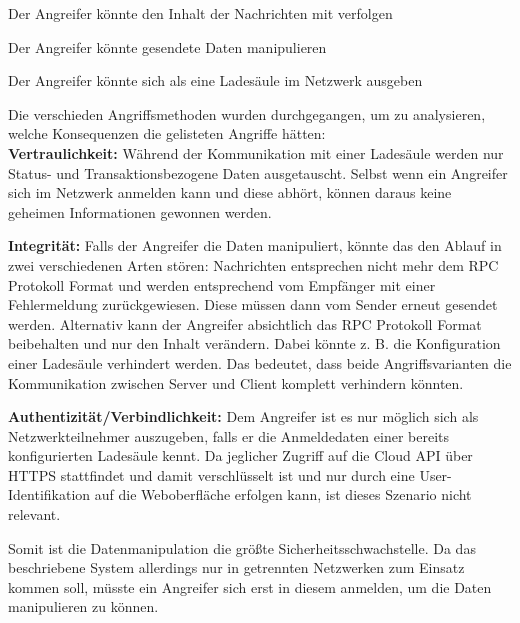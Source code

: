 \begin{description}[leftmargin=177pt]
	\item [\textbf{Vertraulichkeit:}] Der Angreifer könnte den Inhalt der Nachrichten mit verfolgen
	\item [\textbf{Integrität:}] Der Angreifer könnte gesendete Daten manipulieren
	\item [\textbf{Authentizität/Verbindlichkeit:}] Der Angreifer könnte sich als eine Ladesäule im Netzwerk ausgeben
\end{description}

\noindent Die verschieden Angriffsmethoden wurden durchgegangen, um zu analysieren, welche Konsequenzen die gelisteten Angriffe hätten:\\
\noindent \textbf{Vertraulichkeit:} Während der Kommunikation mit einer Ladesäule werden nur Status- und Transaktionsbezogene Daten ausgetauscht. Selbst wenn ein Angreifer sich im Netzwerk anmelden kann und diese abhört, können daraus keine geheimen Informationen gewonnen werden. \newline

\noindent \textbf{Integrität:} Falls der Angreifer die Daten manipuliert, könnte das den Ablauf in zwei verschiedenen Arten stören: Nachrichten entsprechen nicht mehr dem RPC Protokoll Format und werden entsprechend vom Empfänger mit einer Fehlermeldung zurückgewiesen. Diese müssen dann vom Sender erneut gesendet werden. Alternativ kann der Angreifer absichtlich das RPC Protokoll Format beibehalten und nur den Inhalt verändern. Dabei könnte z. B. die Konfiguration einer Ladesäule verhindert werden. Das bedeutet, dass beide Angriffsvarianten die Kommunikation zwischen Server und Client komplett verhindern könnten.\newline

\noindent \textbf{Authentizität/Verbindlichkeit:} Dem Angreifer ist es nur möglich sich als Netzwerkteilnehmer auszugeben, falls er die Anmeldedaten einer bereits konfigurierten Ladesäule kennt. Da jeglicher Zugriff auf die Cloud API über HTTPS stattfindet und damit verschlüsselt ist und nur durch eine User-Identifikation auf die Weboberfläche erfolgen kann, ist dieses Szenario nicht relevant.\newline

\noindent Somit ist die Datenmanipulation die größte Sicherheitsschwachstelle. Da das beschriebene System allerdings nur in getrennten Netzwerken zum Einsatz kommen soll, müsste ein Angreifer sich erst in diesem anmelden, um die Daten manipulieren zu können.\newline

